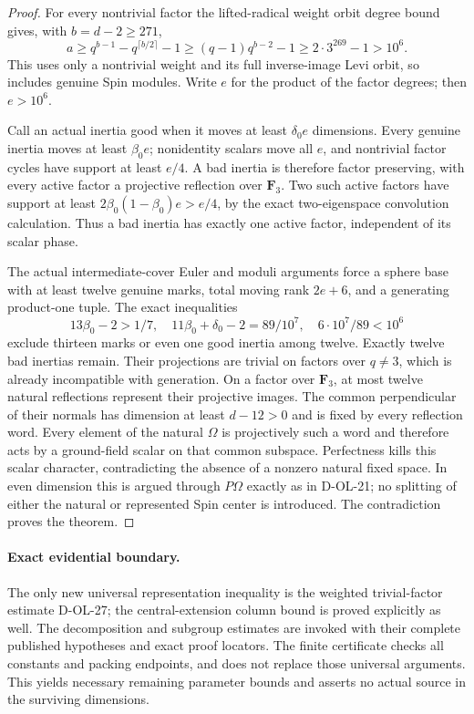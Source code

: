 \begin{proof}
For every nontrivial factor the lifted-radical weight
orbit degree bound gives, with $b=d-2\ge271$,
\[
 a\ge q^{b-1}-q^{\lceil b/2\rceil}-1
      \ge(q-1)q^{b-2}-1
      \ge2\cdot3^{269}-1>10^6.
 \tag{SPO.19}
\]
This uses only a nontrivial weight and its full inverse-image
Levi orbit, so includes genuine Spin modules.
Write $e$ for the product of the factor degrees; then $e>10^6$.

Call an actual inertia good when it moves at least
$\delta_0e$ dimensions.  Every genuine inertia moves
at least $\beta_0e$; nonidentity scalars move all $e$,
and nontrivial factor cycles have support at least $e/4$.
A bad inertia is therefore factor preserving, with
every active factor a projective reflection over $\mathbf F_3$.
Two such active factors have support at least
$2\beta_0(1-\beta_0)e>e/4$, by the exact two-eigenspace
convolution calculation.  Thus a bad inertia has exactly
one active factor, independent of its scalar phase.

The actual intermediate-cover Euler and moduli arguments
force a sphere base with at least twelve genuine marks,
total moving rank $2e+6$, and a generating product-one tuple.
The exact inequalities
\[
 13\beta_0-2>1/7,\quad
 11\beta_0+\delta_0-2=89/10^7,\quad
 6\cdot10^7/89<10^6
 \tag{SPO.20}
\]
exclude thirteen marks or even one good inertia among twelve.
Exactly twelve bad inertias remain.
Their projections are trivial on factors over $q\ne3$,
which is already incompatible with generation.
On a factor over $\mathbf F_3$, at most twelve natural
reflections represent their projective images.
The common perpendicular of their normals has dimension
at least $d-12>0$ and is fixed by every reflection word.
Every element of the natural $\Omega$ is projectively
such a word and therefore acts by a ground-field scalar
on that common subspace.  Perfectness kills this scalar
character, contradicting the absence of a nonzero natural
fixed space.  In even dimension this is argued through
$P\Omega$ exactly as in D-OL-21; no splitting of either
the natural or represented Spin center is introduced.
The contradiction proves the theorem.
\end{proof}

\paragraph{Exact evidential boundary.}
The only new universal representation inequality is the
weighted trivial-factor estimate D-OL-27; the central-extension
column bound is proved explicitly as well.
The decomposition and subgroup estimates are invoked with
their complete published hypotheses and exact proof locators.
The finite certificate checks all constants and packing
endpoints, and does not replace those universal arguments.
This yields necessary remaining parameter bounds and
asserts no actual source in the surviving dimensions.
